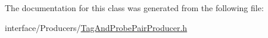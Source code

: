 \label{classTagAndProbeGenMuonProducer_a5d38cd666b0311d82decbd85f9600044}


The documentation for this class was generated from the following file:\begin{DoxyCompactItemize}
\item 
interface/Producers/\hyperlink{TagAndProbePairProducer_8h}{TagAndProbePairProducer.h}\end{DoxyCompactItemize}
